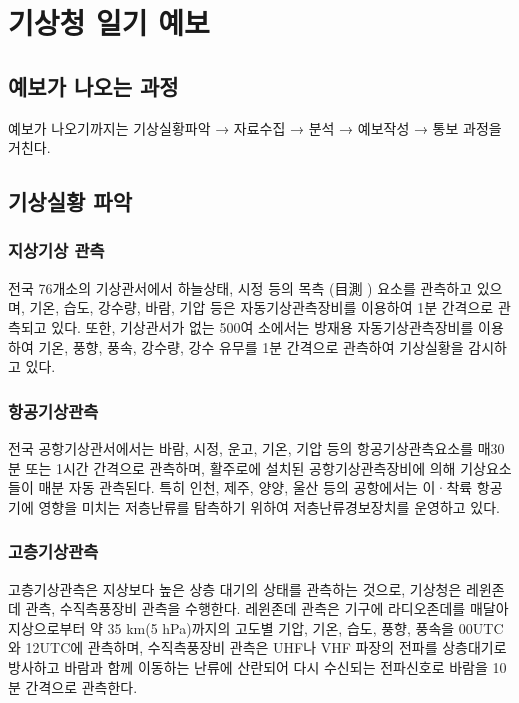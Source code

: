 \chapter{기상청 일기 예보}

\section{예보가 나오는 과정}

예보가 나오기까지는 기상실황파악 → 자료수집 → 분석 → 예보작성 → 통보 과정을 거친다. 

\section{기상실황 파악}

\subsection{지상기상 관측}
전국 76개소의 기상관서에서 하늘상태, 시정 등의 목측 (目測 ) 요소를 관측하고 있으며, 기온, 습도, 강수량, 바람, 기압 등은 자동기상관측장비를 이용하여 1분 간격으로 관측되고 있다. 또한, 기상관서가 없는 500여 소에서는 방재용 자동기상관측장비를 이용하여 기온, 풍향, 풍속, 강수량, 강수 유무를 1분 간격으로 관측하여 기상실황을 감시하고 있다.

\subsection{항공기상관측}
전국 공항기상관서에서는 바람, 시정, 운고, 기온, 기압 등의 항공기상관측요소를 매30분 또는 1시간 간격으로 관측하며, 활주로에 설치된 공항기상관측장비에 의해 기상요소들이 매분 자동 관측된다. 특히 인천, 제주, 양양, 울산 등의 공항에서는 이·착륙 항공기에 영향을 미치는 저층난류를 탐측하기 위하여 저층난류경보장치를 운영하고 있다.

\subsection{고층기상관측}
고층기상관측은 지상보다 높은 상층 대기의 상태를 관측하는 것으로, 기상청은 레윈존데 관측, 수직측풍장비 관측을 수행한다. 레윈존데 관측은 기구에 라디오존데를 매달아 지상으로부터 약 35 km(5 hPa)까지의 고도별 기압, 기온, 습도, 풍향, 풍속을 00UTC와 12UTC에 관측하며, 수직측풍장비 관측은 UHF나 VHF 파장의 전파를 상층대기로 방사하고 바람과 함께 이동하는 난류에 산란되어 다시 수신되는 전파신호로 바람을 10분 간격으로 관측한다.

